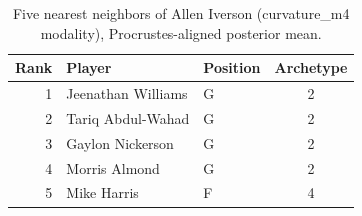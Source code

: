 \begin{table}[htbp]
  \centering\small
  \begin{tabular}{rllc}
    \toprule
    Rank & Player & Position & Archetype \\
    \midrule
    1 & Jeenathan Williams & G & 2 \\
    2 & Tariq Abdul-Wahad & G & 2 \\
    3 & Gaylon Nickerson & G & 2 \\
    4 & Morris Almond & G & 2 \\
    5 & Mike Harris & F & 4 \\
    \bottomrule
  \end{tabular}
  \caption{Five nearest neighbors of Allen Iverson (curvature_m4 modality), Procrustes-aligned posterior mean.}
  \label{tab:Allen_Iverson_neighbors_curvature_m4}
\end{table}

